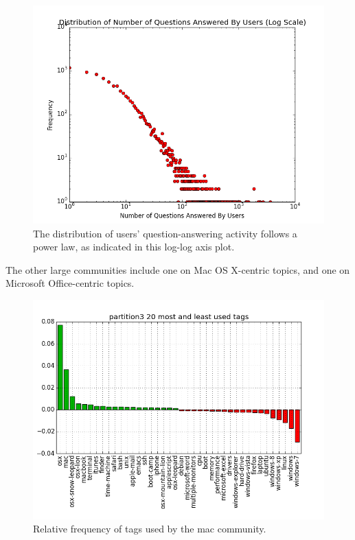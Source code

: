 \documentclass[a4paper]{article}
\begin{document}
\begin{figure}
\centering
\includegraphics[width=\columnwidth]{users-to-questions-answered}
\caption{The distribution of users' question-answering activity follows a power law, as indicated in this log-log axis plot.}
\label{fig:users-to-questions-answered}
\end{figure}

The other large communities include one on Mac OS X-centric topics, and one on Microsoft Office-centric topics.

\begin{figure}
\centering
\includegraphics[width=\columnwidth]{partition3-tags}
\caption{Relative frequency of tags used by the mac community.}
\label{fig:mac-tags}
\end{figure}
\end{document}
